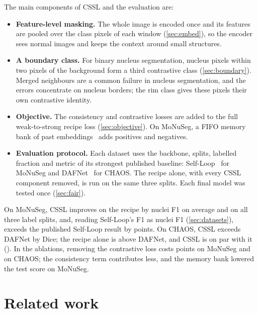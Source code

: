 \documentclass[11pt]{article}
\begin{document}
The main components of CSSL and the evaluation are:
\begin{itemize}[leftmargin=1.5em]
  \item \textbf{Feature-level masking.} The whole image is encoded once and its features are pooled over the class pixels of each window (\cref{sec:embed}), so the encoder sees normal images and keeps the context around small structures.
  \item \textbf{A boundary class.} For binary nucleus segmentation, nucleus pixels within two pixels of the background form a third contrastive class (\cref{sec:boundary}). Merged neighbours are a common failure in nucleus segmentation, and the errors concentrate on nucleus borders; the rim class gives these pixels their own contrastive identity.
  \item \textbf{Objective.} The consistency and contrastive losses are added to the full weak-to-strong recipe loss (\cref{sec:objective}). On MoNuSeg, a FIFO memory bank of past embeddings~\citep{wu2018instance,he2020moco} adds positives and negatives.
  \item \textbf{Evaluation protocol.} Each dataset uses the backbone, splits, labelled fraction and metric of its strongest published baseline: Self-Loop~\citep{li2020selfloop} for MoNuSeg and DAFNet~\citep{chartsias2021dafnet} for CHAOS. The recipe alone, with every CSSL component removed, is run on the same three splits. Each final model was tested once (\cref{sec:fair}).
\end{itemize}

On MoNuSeg, CSSL improves on the recipe by \nMgainRecAbs{} nuclei F1 on average and on all three label splits, and, reading Self-Loop's F1 as nuclei F1 (\cref{sec:datasets}), exceeds the published Self-Loop result by \nMgainSLAbs{} points. On CHAOS, CSSL exceeds DAFNet by \nCgainDAFAbs{} Dice; the recipe alone is \nCrecVsDAFBAbs{} above DAFNet, and CSSL is on par with it (\nCgainRecB). In the ablations, removing the contrastive loss costs \nMDNoCLAbs{} points on MoNuSeg and \nCDNoCLAbs{} on CHAOS; the consistency term contributes less, and the memory bank lowered the test score on MoNuSeg.

\section{Related work}
\label{sec:related}
\end{document}
